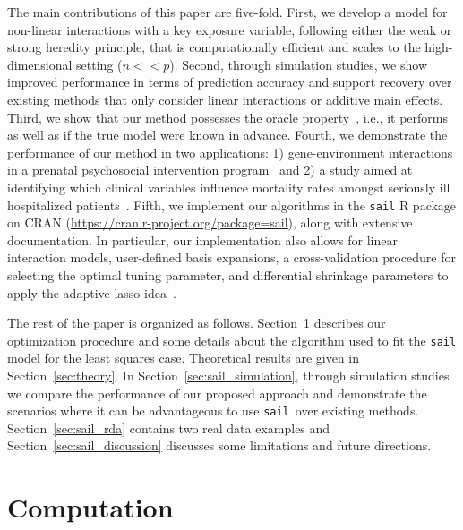 \documentclass[useAMS,usenatbib,referee]{biom}
\newcommand{\sail}{\texttt{sail}}
\begin{document}
The main contributions of this paper are five-fold.
First, we develop a model for non-linear interactions with a key exposure variable, following either the weak or strong heredity principle, that is computationally efficient and scales to the high-dimensional setting ($n << p$).
Second, through simulation studies, we show improved performance in terms of prediction accuracy and support recovery over existing methods that only consider linear interactions or additive main effects.
Third, we show that our method possesses the oracle property~\citep{fan2001variable}, i.e., it performs as well as if the true model were known in advance.
Fourth, we demonstrate the performance of our method in two applications: 1) gene-environment interactions in a prenatal psychosocial intervention program~\cite{olds1998long} and 2) a study aimed at identifying which clinical variables influence mortality rates amongst seriously ill hospitalized patients~\citep{connors1995controlled}.
Fifth, we implement our algorithms in the \texttt{sail} R package on CRAN (\url{https://cran.r-project.org/package=sail}), along with extensive documentation. 
In particular, our implementation also allows for linear interaction models, user-defined basis expansions, a cross-validation procedure for selecting the optimal tuning parameter, and differential shrinkage parameters to apply the adaptive lasso idea~\citep{zou2006adaptive}.

The rest of the paper is organized as follows. Section~\ref{sec:sail_algorithm} describes our optimization procedure and some details about the algorithm used to fit the \texttt{sail} model for the least squares case. Theoretical results are given in Section~\ref{sec:theory}. In Section~\ref{sec:sail_simulation}, through simulation studies we compare the performance of our proposed approach and demonstrate the scenarios where it can be advantageous to use \sail ~over existing methods. Section~\ref{sec:sail_rda} contains two real data examples and Section~\ref{sec:sail_discussion} discusses some limitations and future directions.


\section{Computation} \label{sec:sail_algorithm}
\end{document}

